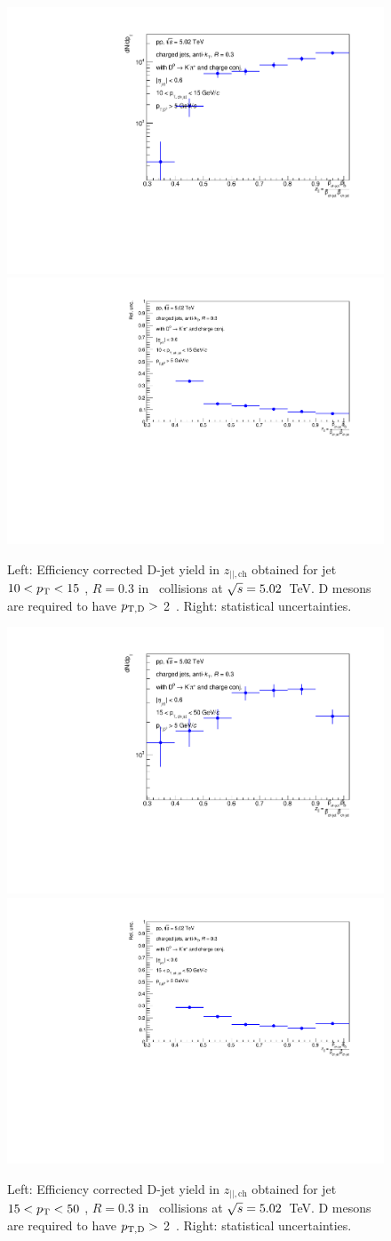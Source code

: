 \begin{figure}[bth]
\centering
\includegraphics[width=0.45\linewidth]{pp_2sig/R3_jetbin_10_15/jetPtSpectrum_SB_RebinProb_pTD5}
\includegraphics[width=0.45\linewidth]{pp_2sig/R3_jetbin_10_15/jetPtSpectrumUnc_SB_Rebin_pTD5}
\caption{Left: Efficiency corrected D-jet yield in $z_{||,\text{ch}}$ obtained for jet $10<p_{\text T}<15$ \GeVc, $R=0.3$ in \pp\ collisions at $\sqrt{s}=5.02$~TeV. D mesons are required to have $p_{\mathrm{T,D}}>$ 2~\GeVc. Right: statistical uncertainties.}
\label{fig:eq_pp_effCorr10_15_R3}
\end{figure}

\begin{figure}[bth]
\centering
\includegraphics[width=0.45\linewidth]{pp_2sig/R3_jetbin_15_50/jetPtSpectrum_SB_RebinProb_pTD5}
\includegraphics[width=0.45\linewidth]{pp_2sig/R3_jetbin_15_50/jetPtSpectrumUnc_SB_Rebin_pTD5}
\caption{Left: Efficiency corrected D-jet yield in $z_{||,\text{ch}}$ obtained for jet $15<p_{\text T}<50$ \GeVc, $R=0.3$ in \pp\ collisions at $\sqrt{s}=5.02$~TeV. D mesons are required to have $p_{\mathrm{T,D}}>$ 2~\GeVc. Right: statistical uncertainties.}
\label{fig:eq_pp_effCorr15_50_R3}
\end{figure}

